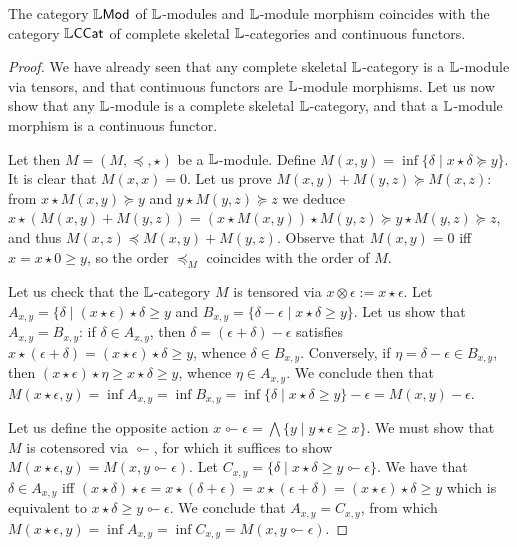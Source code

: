 \begin{theorem}\label{thm:equivalence}
The category $\mathbb{L}\mathsf{Mod}$ of $\mathbb{L}$-modules and $\mathbb{L}$-module morphism coincides with the category $\mathbb{L}\mathsf{CCat}$ of complete skeletal $\mathbb{L}$-categories and continuous functors.
\end{theorem}
\begin{proof}
We have already seen that any complete skeletal $\mathbb{L}$-category is a $\mathbb{L}$-module via tensors, 
and that continuous functors are $\mathbb{L}$-module morphisms.
Let us now show that any $\mathbb{L}$-module is a complete skeletal $\mathbb{L}$-category, and that a $\mathbb{L}$-module morphism is a continuous functor.

Let then $M=(M,\preceq, \star)$ be a $\mathbb{L}$-module. Define $M(x,y)= \inf\{ \delta \mid x\star \delta \succeq y\}$.
 It is clear that $M(x,x)=0$. Let us prove $M(x,y)+M(y,z) \succeq M(x,z)$: 
from $x\star M(x,y)\succeq y$ and $y\star M(y,z)\succeq z$ we deduce 
$x\star(M(x,y)+M(y,z))= (x\star M(x,y))\star M(y,z) \succeq y\star M(y,z)\succeq z$, and thus 
$M(x,z)\preceq M(x,y)+M(y,z)$. 
Observe that $M(x,y)=0$ iff $x=x\star 0\geq y$, so the order $\preceq_{M}$ coincides with the order of $M$.

Let us check that the $\mathbb{L}$-category $M$ is tensored via $x\otimes \epsilon:=x\star\epsilon$.
Let $A_{x,y}= \{ \delta \mid (x\star\epsilon)\star \delta \geq y$ and 
$B_{x,y}=\{\delta-\epsilon\mid x\star \delta \geq y\}$.
Let us show that $A_{x,y}=B_{x,y}$: if $\delta \in A_{x,y}$, then 
$\delta=(\epsilon+\delta)-\epsilon$ satisfies 
$x\star(\epsilon+\delta)=(x\star\epsilon)\star \delta \geq y$, whence 
$\delta\in B_{x,y}$. Conversely, if $\eta=\delta-\epsilon\in B_{x,y}$, then 
$(x\star\epsilon)\star \eta \geq x\star \delta \geq y$, whence $\eta\in A_{x,y}$.
We conclude then that $M(x\star\epsilon,y)=\inf A_{x,y}=\inf B_{x,y}=
\inf\{\delta \mid x\star \delta \geq y\}-\epsilon=M(x,y)-\epsilon$.


Let us define the opposite action $x\multimapinv \epsilon= \bigwedge\{y \mid 
y\star \epsilon \geq x\}$. We must show that $M$ is cotensored via $\multimapinv$, for which it suffices to show $M(x\star \epsilon,y)=M(x,y\multimapinv \epsilon)$. Let $C_{x,y}=\{\delta \mid 
x\star \delta \geq y\multimapinv \epsilon\}$. We have that $\delta \in A_{x,y}$ iff  
$(x\star \delta)\star \epsilon=x\star(\delta+\epsilon)=x\star(\epsilon+\delta)=(x\star \epsilon)\star \delta \geq y$ which is equivalent to $x\star\delta \geq y\multimapinv \epsilon$. We conclude that $A_{x,y}=C_{x,y}$, from which $M(x\star \epsilon,y)=\inf A_{x,y}=\inf C_{x,y}=M(x,y\multimapinv \epsilon)$.




\end{proof}
